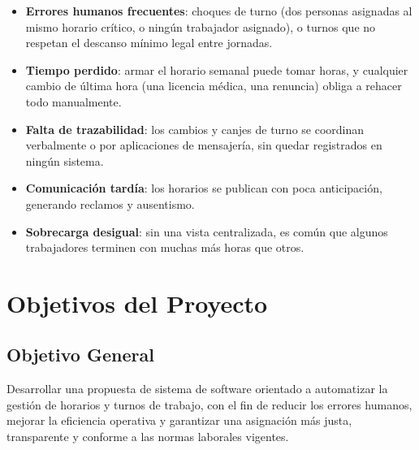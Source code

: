 \documentclass[11pt,letterpaper]{article}
\begin{document}
\begin{itemize}[leftmargin=1.2cm]
    \item \textbf{Errores humanos frecuentes}: choques de turno (dos personas asignadas al mismo horario crítico, o ningún trabajador asignado), o turnos que no respetan el descanso mínimo legal entre jornadas.
    \item \textbf{Tiempo perdido}: armar el horario semanal puede tomar horas, y cualquier cambio de última hora (una licencia médica, una renuncia) obliga a rehacer todo manualmente.
    \item \textbf{Falta de trazabilidad}: los cambios y canjes de turno se coordinan verbalmente o por aplicaciones de mensajería, sin quedar registrados en ningún sistema.
    \item \textbf{Comunicación tardía}: los horarios se publican con poca anticipación, generando reclamos y ausentismo.
    \item \textbf{Sobrecarga desigual}: sin una vista centralizada, es común que algunos trabajadores terminen con muchas más horas que otros.
\end{itemize}

\section{Objetivos del Proyecto}

\subsection{Objetivo General}
Desarrollar una propuesta de sistema de software orientado a automatizar la gestión de horarios y turnos de trabajo, con el fin de reducir los errores humanos, mejorar la eficiencia operativa y garantizar una asignación más justa, transparente y conforme a las normas laborales vigentes.
\end{document}
